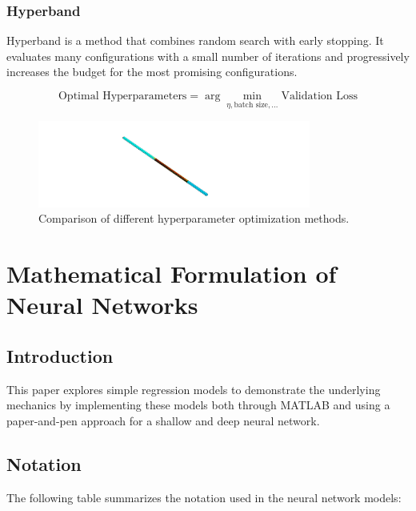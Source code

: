         \subsubsection{Hyperband}

            Hyperband is a method that combines random search with early stopping. It evaluates many configurations with a small number of iterations and progressively increases the budget for the most promising configurations.

            \begin{equation}
            \text{Optimal Hyperparameters} = \arg \min_{\eta, \text{batch size}, \ldots} \text{Validation Loss}
            \end{equation}

    \begin{figure}[h]
        \centering
        \includegraphics[width=0.8\textwidth]{00_Images/00_Velocity.png}
        \caption{Comparison of different hyperparameter optimization methods.}
        \label{fig:hyperparameter_optimization}
    \end{figure}

\section{Mathematical Formulation of Neural Networks}
        \subsection{Introduction}
        This paper explores simple regression models to demonstrate the underlying mechanics by implementing these models both through MATLAB and using a paper-and-pen approach for a shallow and deep neural network.

        \newpage \subsection{Notation}
        The following table summarizes the notation used in the neural network models:

